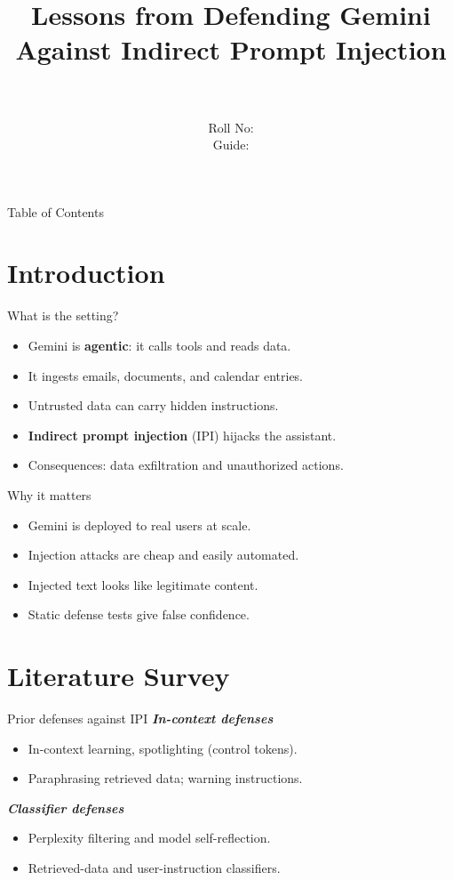\documentclass{beamer}
\title[\seminarShortTitle]{Lessons from Defending Gemini Against Indirect Prompt Injection}
\author[\seminarName\ (\seminarShortCollege)]{\seminarName \\ \seminarRoll \\ Roll No: \seminarClassRoll \\ Guide: \seminarGuide}
\institute[\seminarShortCollege]{\seminarDept \\ \seminarCollege}
\date{\seminarDate}
\begin{document}
\begin{frame}\titlepage\end{frame}
\begin{frame}{Table of Contents}\tableofcontents\end{frame}
\section{Introduction}
\begin{frame}{What is the setting?}
\begin{itemize}
\item Gemini is \textbf{agentic}: it calls tools and reads data.
\item It ingests emails, documents, and calendar entries.
\item Untrusted data can carry hidden instructions.
\item \textbf{Indirect prompt injection} (IPI) hijacks the assistant.
\item Consequences: data exfiltration and unauthorized actions.
\end{itemize}
\end{frame}

\begin{frame}{Why it matters}
\begin{itemize}
\item Gemini is deployed to real users at scale.
\item Injection attacks are cheap and easily automated.
\item Injected text looks like legitimate content.
\item Static defense tests give false confidence.
\end{itemize}
\end{frame}

\section{Literature Survey}
\begin{frame}{Prior defenses against IPI}
\textbf{\textit{In-context defenses}}
\begin{itemize}
\item In-context learning, spotlighting (control tokens).
\item Paraphrasing retrieved data; warning instructions.
\end{itemize}
\textbf{\textit{Classifier defenses}}
\begin{itemize}
\item Perplexity filtering and model self-reflection.
\item Retrieved-data and user-instruction classifiers.
\end{itemize}
\end{frame}
\end{document}
